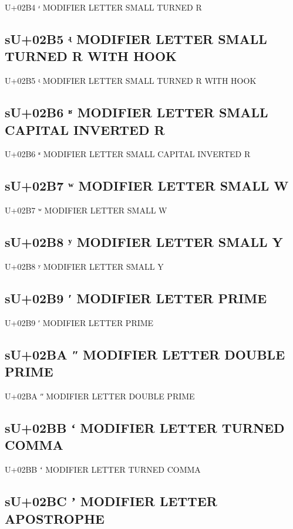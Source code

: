 U+02B4 ʴ MODIFIER LETTER SMALL TURNED R

\subsection{sU+02B5 ʵ MODIFIER LETTER SMALL TURNED R WITH HOOK}

U+02B5 ʵ MODIFIER LETTER SMALL TURNED R WITH HOOK

\subsection{sU+02B6 ʶ MODIFIER LETTER SMALL CAPITAL INVERTED R}

U+02B6 ʶ MODIFIER LETTER SMALL CAPITAL INVERTED R

\subsection{sU+02B7 ʷ MODIFIER LETTER SMALL W}

U+02B7 ʷ MODIFIER LETTER SMALL W

\subsection{sU+02B8 ʸ MODIFIER LETTER SMALL Y}

U+02B8 ʸ MODIFIER LETTER SMALL Y

\subsection{sU+02B9 ʹ MODIFIER LETTER PRIME}

U+02B9 ʹ MODIFIER LETTER PRIME

\subsection{sU+02BA ʺ MODIFIER LETTER DOUBLE PRIME}

U+02BA ʺ MODIFIER LETTER DOUBLE PRIME

\subsection{sU+02BB ʻ MODIFIER LETTER TURNED COMMA}

U+02BB ʻ MODIFIER LETTER TURNED COMMA

\subsection{sU+02BC ʼ MODIFIER LETTER APOSTROPHE}


